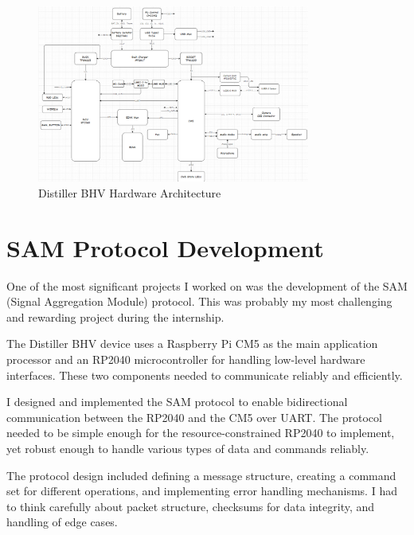 \documentclass[12pt,a4paper]{report}
\begin{document}
\begin{figure}[h]
    \centering
    \includegraphics[width=0.8\textwidth]{bhv_hardware_architecture.png}
    \caption{Distiller BHV Hardware Architecture}
\end{figure}

\section{SAM Protocol Development}

One of the most significant projects I worked on was the development of the SAM (Signal Aggregation Module) protocol. This was probably my most challenging and rewarding project during the internship.

\vspace{0.3cm}

The Distiller BHV device uses a Raspberry Pi CM5 as the main application processor and an RP2040 microcontroller for handling low-level hardware interfaces. These two components needed to communicate reliably and efficiently.

\vspace{0.3cm}

I designed and implemented the SAM protocol to enable bidirectional communication between the RP2040 and the CM5 over UART. The protocol needed to be simple enough for the resource-constrained RP2040 to implement, yet robust enough to handle various types of data and commands reliably.

\vspace{0.3cm}

The protocol design included defining a message structure, creating a command set for different operations, and implementing error handling mechanisms. I had to think carefully about packet structure, checksums for data integrity, and handling of edge cases.
\end{document}
